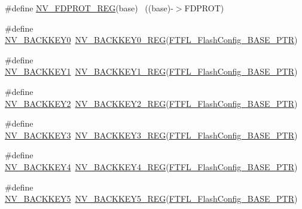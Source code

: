 \begin{DoxyCompactItemize}
\item 
\#define \hyperlink{group___n_v___register___accessor___macros_ga8c387944c38c4df1397982458df8a2f1}{N\+V\+\_\+\+F\+D\+P\+R\+O\+T\+\_\+\+R\+EG}(base)                                        ~((base)-\/$>$F\+D\+P\+R\+OT)
\item 
\#define \hyperlink{group___n_v___register___accessor___macros_gadb8e2eb4db4de2a485b31c2a1dd393af}{N\+V\+\_\+\+B\+A\+C\+K\+K\+E\+Y0}~\hyperlink{group___n_v___register___accessor___macros_ga905f2d4f792d634634d339e5b6170fe1}{N\+V\+\_\+\+B\+A\+C\+K\+K\+E\+Y0\+\_\+\+R\+EG}(\hyperlink{group___n_v___peripheral_gad199a235b90fe3e6afb977f2d6a9c565}{F\+T\+F\+L\+\_\+\+Flash\+Config\+\_\+\+B\+A\+S\+E\+\_\+\+P\+TR})
\item 
\#define \hyperlink{group___n_v___register___accessor___macros_gae849f8e6eaa76305b07c567463074dc9}{N\+V\+\_\+\+B\+A\+C\+K\+K\+E\+Y1}~\hyperlink{group___n_v___register___accessor___macros_gaa618f324e87cf548f4736270e46fcc57}{N\+V\+\_\+\+B\+A\+C\+K\+K\+E\+Y1\+\_\+\+R\+EG}(\hyperlink{group___n_v___peripheral_gad199a235b90fe3e6afb977f2d6a9c565}{F\+T\+F\+L\+\_\+\+Flash\+Config\+\_\+\+B\+A\+S\+E\+\_\+\+P\+TR})
\item 
\#define \hyperlink{group___n_v___register___accessor___macros_ga51642a3d84acba43ff0aa3925226ab32}{N\+V\+\_\+\+B\+A\+C\+K\+K\+E\+Y2}~\hyperlink{group___n_v___register___accessor___macros_gaad90d55fc5c046a8e8508b04cbe2fbbb}{N\+V\+\_\+\+B\+A\+C\+K\+K\+E\+Y2\+\_\+\+R\+EG}(\hyperlink{group___n_v___peripheral_gad199a235b90fe3e6afb977f2d6a9c565}{F\+T\+F\+L\+\_\+\+Flash\+Config\+\_\+\+B\+A\+S\+E\+\_\+\+P\+TR})
\item 
\#define \hyperlink{group___n_v___register___accessor___macros_ga18932af5b184d02998db112b364e45e1}{N\+V\+\_\+\+B\+A\+C\+K\+K\+E\+Y3}~\hyperlink{group___n_v___register___accessor___macros_ga3f3d8bddafcafafb27fb8981656492e1}{N\+V\+\_\+\+B\+A\+C\+K\+K\+E\+Y3\+\_\+\+R\+EG}(\hyperlink{group___n_v___peripheral_gad199a235b90fe3e6afb977f2d6a9c565}{F\+T\+F\+L\+\_\+\+Flash\+Config\+\_\+\+B\+A\+S\+E\+\_\+\+P\+TR})
\item 
\#define \hyperlink{group___n_v___register___accessor___macros_ga5f7ba38a88074b8b658dfe992c73482c}{N\+V\+\_\+\+B\+A\+C\+K\+K\+E\+Y4}~\hyperlink{group___n_v___register___accessor___macros_gae867c53e6918c6a7c16ccba9ee512dc1}{N\+V\+\_\+\+B\+A\+C\+K\+K\+E\+Y4\+\_\+\+R\+EG}(\hyperlink{group___n_v___peripheral_gad199a235b90fe3e6afb977f2d6a9c565}{F\+T\+F\+L\+\_\+\+Flash\+Config\+\_\+\+B\+A\+S\+E\+\_\+\+P\+TR})
\item 
\#define \hyperlink{group___n_v___register___accessor___macros_ga7b8e49b6530c2192672343b7f32ae5e8}{N\+V\+\_\+\+B\+A\+C\+K\+K\+E\+Y5}~\hyperlink{group___n_v___register___accessor___macros_gaeeb967dc21f8077cef911eae743d7f12}{N\+V\+\_\+\+B\+A\+C\+K\+K\+E\+Y5\+\_\+\+R\+EG}(\hyperlink{group___n_v___peripheral_gad199a235b90fe3e6afb977f2d6a9c565}{F\+T\+F\+L\+\_\+\+Flash\+Config\+\_\+\+B\+A\+S\+E\+\_\+\+P\+TR})

\end{DoxyCompactItemize}

